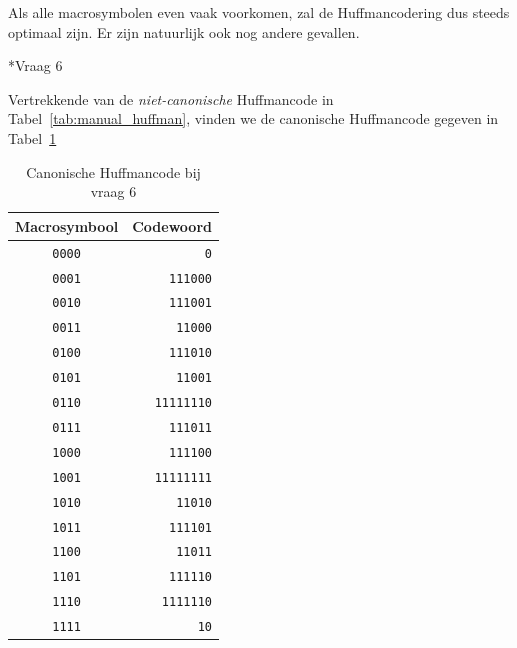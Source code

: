 \documentclass[]{article}
\begin{document}
\begin{section}
\begin{subsection}
        Als alle macrosymbolen even vaak voorkomen, zal de
        Huffmancodering dus steeds optimaal zijn. Er zijn natuurlijk
        ook nog andere gevallen.

    \end{subsection}

    \begin{subsection}*{Vraag 6}

        Vertrekkende van de \emph{niet-canonische} Huffmancode in
        Tabel~\ref{tab:manual_huffman}, vinden we de canonische
        Huffmancode gegeven in Tabel~\ref{tab:canonical_huffman}

        \begin{table}
            \centering
            \begin{tabular}{c|r}
                \textbf{Macrosymbool} &
                \textbf{Codewoord} \\
                \hline
                \texttt{0000} & \texttt{0} \\
                \texttt{0001} & \texttt{111000} \\
                \texttt{0010} & \texttt{111001} \\
                \texttt{0011} & \texttt{11000} \\
                \texttt{0100} & \texttt{111010} \\
                \texttt{0101} & \texttt{11001} \\
                \texttt{0110} & \texttt{11111110} \\
                \texttt{0111} & \texttt{111011} \\
                \texttt{1000} & \texttt{111100} \\
                \texttt{1001} & \texttt{11111111} \\
                \texttt{1010} & \texttt{11010} \\
                \texttt{1011} & \texttt{111101} \\
                \texttt{1100} & \texttt{11011} \\
                \texttt{1101} & \texttt{111110} \\
                \texttt{1110} & \texttt{1111110} \\
                \texttt{1111} & \texttt{10} \\
            \end{tabular}
            \caption{Canonische Huffmancode bij vraag 6}
            \label{tab:canonical_huffman}
        \end{table}


\end{subsection}
\end{section}
\end{document}
